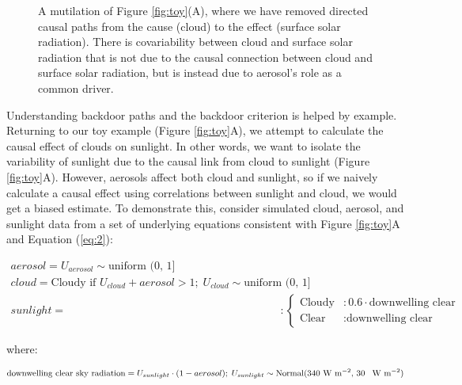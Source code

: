 \documentclass[12pt]{article}
\begin{document}
\begin{figure}
  
  \caption{A mutilation of Figure \ref{fig:toy}(A), where we have
    removed directed causal paths from the cause (cloud) to the effect
    (surface solar radiation). There is covariability between cloud
    and surface solar radiation that is not due to the causal
    connection between cloud and surface solar radiation, but is
    instead due to aerosol's role as a common driver.}
  \label{fig:mutilated-toy}
\end{figure}

Understanding backdoor paths and the backdoor criterion is helped by
example. Returning to our toy example (Figure \ref{fig:toy}A), we
attempt to calculate the causal effect of clouds on sunlight. In other
words, we want to isolate the variability of sunlight due to the
causal link from cloud to sunlight (Figure \ref{fig:toy}A). However,
aerosols affect both cloud and sunlight, so if we naively calculate a
causal effect using correlations between sunlight and cloud, we would
get a biased estimate. To demonstrate this, consider simulated cloud,
aerosol, and sunlight data from a set of underlying equations
consistent with Figure \ref{fig:toy}A and Equation (\ref{eq:2}):


\begin{align}
  aerosol = U_{aerosol} \sim \text{uniform (0, 1]}\\
  cloud = \text{Cloudy if } U_{cloud} + aerosol > 1; \;
  U_{cloud} \sim \text{uniform (0, 1]}\\
  sunlight = &: \begin{cases}
    \text{Cloudy} &: 0.6 \cdot \text{downwelling clear sky radiation}  \\
    \text{Clear} &: \text{downwelling clear sky radiation}
  \end{cases}
\end{align}

where:

\begin{equation*}
  \text{downwelling clear sky radiation} = U_{sunlight} \cdot (1 - aerosol); \;
  U_{sunlight} \sim \text{Normal(340 W m$^{-2}$, 30 \, W m$^{-2}$)}
\end{equation*}
\end{document}
